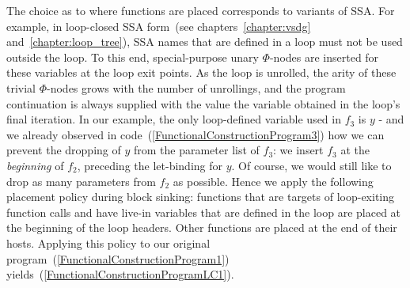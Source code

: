 {The choice as to where functions are placed corresponds to variants of
SSA. For example, in loop-closed SSA form~(see
chapters~\ref{chapter:vsdg} and~\ref{chapter:loop_tree}), SSA names that
are defined in a loop must not be used outside the loop. To this end,
special-purpose unary $\Phi$-nodes are inserted for these variables at
the loop exit points. As the loop is unrolled, the arity of these
trivial $\Phi$-nodes grows with the number of unrollings, and the
program continuation is always supplied with the value the variable
obtained in the loop's final iteration.  In our example, the only
loop-defined variable used in $f_3$ is $y$ - and we already observed
in code~(\ref{FunctionalConstructionProgram3}) how we can prevent the
dropping of $y$ from the parameter list of $f_3$: we insert $f_3$ at
the \emph{beginning} of $f_2$, preceding the let-binding for $y$. Of
course, we would still like to drop as many parameters from $f_2$ as
possible. Hence we apply the following placement policy during block
sinking: functions that are targets of loop-exiting function calls and
have live-in variables that are defined in the loop are placed at the
beginning of the loop headers.  Other functions are placed at the end
of their hosts. Applying this policy to our original
program~(\ref{FunctionalConstructionProgram1})
yields~(\ref{FunctionalConstructionProgramLC1}).
}
